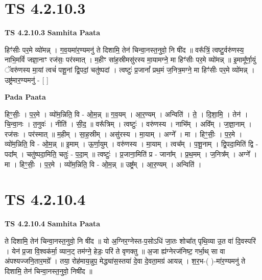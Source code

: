 \documentclass[17pt]{extarticle}
\begin{document}
\section*{ TS 4.2.10.3 }

\textbf{TS 4.2.10.3 } \newline
\textbf{Samhita Paata} \newline

हिꣳ॑सीः पर॒मे व्यो॑मन्न् । ग॒व॒यमा॑र॒ण्यमनु॑ ते दिशामि॒ तेन॑ चिन्वा॒नस्त॒नुवो॒ नि षी॑द ॥ वरू᳚त्रिं॒ त्वष्टु॒र्वरु॑णस्य॒ नाभि॒मविं॑ जज्ञा॒नाꣳ रज॑सः॒ पर॑स्मात् । म॒हीꣳ सा॑ह॒स्रीमसु॑रस्य मा॒यामग्ने॒ मा हिꣳ॑सीः पर॒मे व्यो॑मन्न् ॥ इ॒मामू᳚र्णा॒युं ॅवरु॑णस्य मा॒यां त्वचं॑ पशू॒नां द्वि॒पदां॒ चतु॑ष्पदां । त्वष्टुः॑ प्र॒जानां᳚ प्रथ॒मं ज॒नित्र॒मग्ने॒ मा हिꣳ॑सीः पर॒मे व्यो॑मन्न् । उष्ट्र॑मार॒ण्यमनु॑ - [  ] \newline

\textbf{Pada Paata} \newline

हिꣳ॒॒सीः॒ । प॒र॒मे । व्यो॑म॒न्निति॒ वि - ओ॒म॒न्न् ॥ ग॒व॒यम् । आ॒र॒ण्यम् । अन्विति॑ । ते॒ । दि॒शा॒मि॒ । तेन॑ । चि॒न्वा॒नः । त॒नुवः॑ । नीति॑ । सी॒द॒ ॥ वरू᳚त्रिम् । त्वष्टुः॑ । वरु॑णस्य । नाभि᳚म् । अवि᳚म् । ज॒ज्ञा॒नाम् । रज॑सः । पर॑स्मात् ॥ म॒हीम् । सा॒ह॒स्रीम् । असु॑रस्य । मा॒याम् । अग्ने᳚ । मा । हिꣳ॒॒सीः॒ । प॒र॒मे । व्यो॑म॒न्निति॒ वि - ओ॒म॒न्न् ॥ इ॒माम् । ऊ॒र्णा॒युम् । वरु॑णस्य । मा॒याम् । त्वच᳚म् । प॒शू॒नाम् । द्वि॒पदा॒मिति॑ द्वि - पदा᳚म् । चतु॑ष्पदा॒मिति॒ चतुः॑ - प॒दा॒म् ॥ त्वष्टुः॑ । प्र॒जाना॒मिति॑ प्र - जाना᳚म् । प्र॒थ॒मम् । ज॒नित्र᳚म् । अग्ने᳚ । मा । हिꣳ॒॒सीः॒ । प॒र॒मे । व्यो॑म॒न्निति॒ वि - ओ॒म॒न्न् ॥ उष्ट्र᳚म् । आ॒र॒ण्यम् । अन्विति॑ ।  \newline




\section*{ TS 4.2.10.4 }

\textbf{TS 4.2.10.4 } \newline
\textbf{Samhita Paata} \newline

ते दिशामि॒ तेन॑ चिन्वा॒नस्त॒नुवो॒ नि षी॑द ॥ यो अ॒ग्निर॒ग्नेस्त-प॒सोऽधि॑ जा॒तः शोचा᳚त् पृथि॒व्या उ॒त वा॑ दि॒वस्परि॑ । येन॑ प्र॒जा वि॒श्वक॑र्मा॒ व्यान॒ट् तम॑ग्ने॒ हेडः॒ परि॑ ते वृणक्तु ॥ अ॒जा ह्य॑ग्नेरज॑निष्ट॒ गर्भा॒थ् सा वा अ॑पश्यज्जनि॒तार॒मग्रे᳚ । तया॒ रोह॑माय॒न्नुप॒ मेद्ध्या॑स॒स्तया॑ दे॒वा दे॒वता॒मग्र॑ आयन्न् । श॒र॒भ-( )-मा॑र॒ण्यमनु॑ ते दिशामि॒ तेन॑ चिन्वा॒नस्त॒नुवो॒ निषी॑द ॥ \newline
\end{document}
